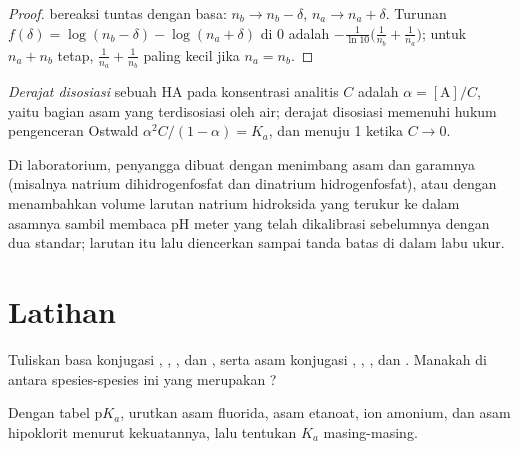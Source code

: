 \begin{proof}
 bereaksi tuntas dengan basa: $n_b \to n_b - \delta$,
$n_a \to n_a + \delta$. Turunan $f(\delta) = \log(n_b - \delta) -
\log(n_a + \delta)$ di 0 adalah $-\frac{1}{\ln10}\big(\frac{1}{n_b} +
\frac{1}{n_a}\big)$; untuk $n_a + n_b$ tetap, $\frac1{n_a} + \frac1{n_b}$
paling kecil jika $n_a = n_b$.
\end{proof}

\begin{definition}\label{def:b1:predominant-reaction:dissociation}
\emph{Derajat disosiasi} sebuah  HA
pada konsentrasi analitis $C$ adalah $\alpha = [\mathrm{A}]/C$, yaitu
bagian asam yang terdisosiasi oleh air; derajat disosiasi memenuhi
hukum pengenceran Ostwald $\alpha^2C/(1 - \alpha) = K_a$, dan menuju 1
ketika $C \to 0$.
\end{definition}

\begin{inthelab}
Di laboratorium, penyangga dibuat dengan menimbang asam dan garamnya
(misalnya natrium dihidrogenfosfat dan dinatrium hidrogenfosfat), atau
dengan menambahkan volume larutan natrium hidroksida yang terukur ke
dalam asamnya sambil membaca pH meter yang telah dikalibrasi sebelumnya
dengan dua  standar; larutan itu lalu diencerkan sampai
tanda batas di dalam labu ukur.
\end{inthelab}

\section{Latihan}

\begin{exercise}[$\star$]\label{exo:b1:predominant-reaction:1}
Tuliskan basa konjugasi , , , dan ,
serta asam konjugasi , , , dan .
Manakah di antara spesies-spesies ini yang merupakan ?
\end{exercise}

\begin{exercise}[$\star$]\label{exo:b1:predominant-reaction:2}
Dengan tabel $\mathrm{p}K_a$, urutkan asam fluorida, asam etanoat, ion
amonium, dan asam hipoklorit menurut kekuatannya, lalu tentukan $K_a$
masing-masing.
\end{exercise}

